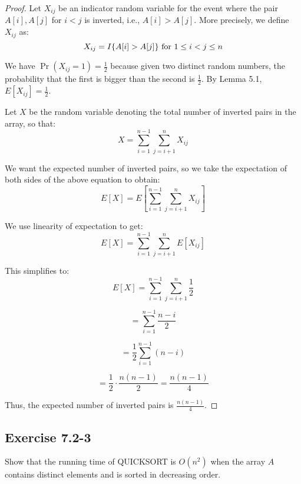 \documentclass{article}
\begin{document}
\begin{proof}

Let $X_{ij}$ be an indicator random variable for the event where the pair $A[i], A[j]$ for $i < j$ is inverted, i.e., $A[i] > A[j]$. 
More precisely, we define $X_{ij}$ as:
\[ X_{ij} = I\{A[i] > A[j]\} \text{ for } 1 \leq i < j \leq n \\
\]

We have $\Pr(X_{ij} = 1) = \frac{1}{2}$ because given two distinct random numbers, the probability that the first is bigger than the second is $\frac{1}{2}$. By Lemma 5.1, $E[X_{ij}] = \frac{1}{2}$.

Let $X$ be the random variable denoting the total number of inverted pairs in the array, so that:
\[ X = \sum_{i=1}^{n-1} \sum_{j=i+1}^{n} X_{ij}
\]

We want the expected number of inverted pairs, so we take the expectation of both sides of the above equation to obtain:
\[ E[X] = E\left[ \sum_{i=1}^{n-1} \sum_{j=i+1}^{n} X_{ij} \right]
\]

We use linearity of expectation to get:
\[ E[X] = \sum_{i=1}^{n-1} \sum_{j=i+1}^{n} E[X_{ij}]
\]

This simplifies to:
\[ E[X] = \sum_{i=1}^{n-1} \sum_{j=i+1}^{n} \frac{1}{2}
\]

\[     = \sum_{i=1}^{n-1} \frac{n - i}{2}
\]

\[     = \frac{1}{2} \sum_{i=1}^{n-1} (n - i)
\]

\[     = \frac{1}{2} \cdot \frac{n(n-1)}{2} = \frac{n(n-1)}{4}
\]

Thus, the expected number of inverted pairs is $\frac{n(n-1)}{4}$.
\end{proof}

\subsection*{Exercise 7.2-3}
%
Show that the running time of QUICKSORT is $O(n^2)$ when the array $A$ contains distinct elements and is sorted in decreasing order.
\end{document}
